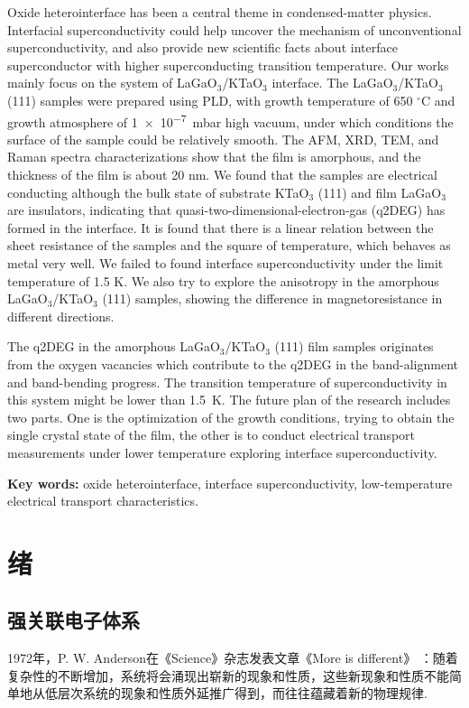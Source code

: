 \documentclass[12pt,a4paper,openany,twoside,UTF-8]{book}
\begin{document}
Oxide heterointerface has been a central theme in condensed-matter physics. Interfacial superconductivity could help uncover the mechanism of unconventional superconductivity, and also provide new scientific facts about interface superconductor with higher superconducting transition temperature. Our works mainly focus on the system of LaGaO$_3$/KTaO$_3$ interface. The LaGaO$_3$/KTaO$_3$ (111) samples were prepared using PLD, with growth temperature of 650 $^\circ$C and growth atmosphere of \SI{1e-7}{mbar} high vacuum, under which conditions the surface of the sample could be relatively smooth. The AFM, XRD, TEM, and Raman spectra characterizations show that the film is amorphous, and the thickness of the film is about 20 nm. We found that the samples are electrical conducting although the bulk state of substrate KTaO$_3$ (111) and film LaGaO$_3$ are insulators, indicating that quasi-two-dimensional-electron-gas (q2DEG) has formed in the interface. It is found that there is a linear relation between the sheet resistance of the samples and the square of temperature, which behaves as metal very well. We failed to found interface superconductivity under the limit temperature of 1.5 K. We also try to explore the anisotropy in the amorphous LaGaO$_3$/KTaO$_3$ (111) samples, showing the difference in magnetoresistance in different directions.

The q2DEG in the amorphous LaGaO$_3$/KTaO$_3$ (111) film samples originates from the oxygen vacancies which contribute to the q2DEG in the band-alignment and band-bending progress. The transition temperature of superconductivity in this system might be lower than \SI{1.5}{K}. The future plan of the research includes two parts. One is the optimization of the growth conditions, trying to obtain the single crystal state of the film, the other is to conduct electrical transport measurements under lower temperature exploring interface superconductivity.


\quad

\textbf{Key words: }oxide heterointerface, interface superconductivity, low-temperature electrical transport characteristics.




\chapter{绪}
\label{sec_1}
\setcounter{page}{1}
\section{强关联电子体系}
1972年，P. W. Anderson在《Science》杂志发表文章《More is different》 \cite{ref1}：随着复杂性的不断增加，系统将会涌现出崭新的现象和性质，这些新现象和性质不能简单地从低层次系统的现象和性质外延推广得到，而往往蕴藏着新的物理规律. 
\end{document}
